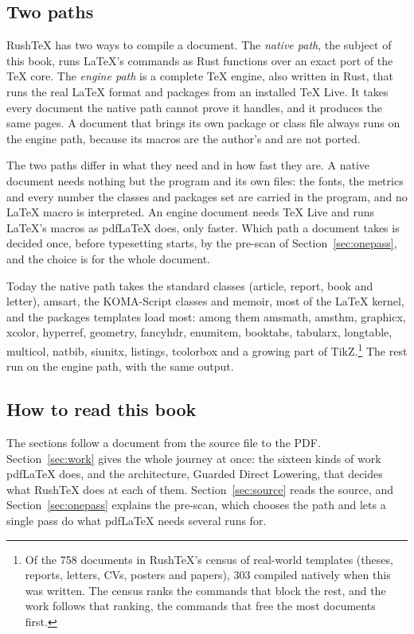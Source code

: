 \documentclass{article}
\numberwithin{equation}{section}
\newcommand{\gdl}{Guarded Direct Lowering}
\theoremstyle{definition}
\theoremstyle{remark}
\begin{document}
\subsection{Two paths}

RushTeX has two ways to compile a document. The \emph{native path}, the subject of this
book, runs \LaTeX's commands as Rust functions over an exact port of the \TeX{} core.
The \emph{engine path} is a complete \TeX{} engine, also written in Rust, that runs the
real \LaTeX{} format and packages from an installed \TeX{} Live. It takes every document
the native path cannot prove it handles, and it produces the same pages. A document
that brings its own package or class file always runs on the engine path, because its
macros are the author's and are not ported.

The two paths differ in what they need and in how fast they are. A native document needs
nothing but the program and its own files: the fonts, the metrics and every number the
classes and packages set are carried in the program, and no \LaTeX{} macro is
interpreted. An engine document needs \TeX{} Live and runs \LaTeX's macros as pdfLaTeX
does, only faster. Which path a document takes is decided once, before typesetting
starts, by the pre-scan of Section~\ref{sec:onepass}, and the choice is for the whole
document.

Today the native path takes the standard classes (article, report, book and letter),
amsart, the KOMA-Script classes and memoir, most of the \LaTeX{} kernel, and the packages
templates load most: among them amsmath, amsthm, graphicx, xcolor, hyperref, geometry,
fancyhdr, enumitem, booktabs, tabularx, longtable, multicol, natbib, siunitx, listings,
tcolorbox and a growing part of TikZ.\footnote{Of the 758 documents in RushTeX's census of
real-world templates (theses, reports, letters, CVs, posters and papers), 303 compiled
natively when this was written. The census ranks the commands that block the rest, and
the work follows that ranking, the commands that free the most documents first.} The
rest run on the engine path, with the same output.

\subsection{How to read this book}

The sections follow a document from the source file to the PDF.
Section~\ref{sec:work} gives the whole journey at once: the sixteen kinds of work
pdfLaTeX does, and the architecture, \gdl, that decides what RushTeX does at each of
them. Section~\ref{sec:source} reads the source, and Section~\ref{sec:onepass} explains
the pre-scan, which chooses the path and lets a single pass do what pdfLaTeX needs
several runs for.
\end{document}
